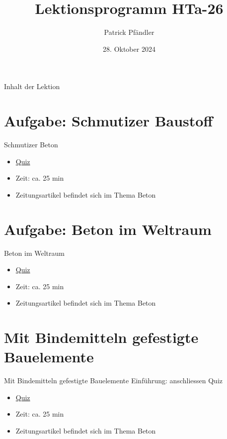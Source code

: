 

\title{\textbf{Lektionsprogramm HTa-26}}
\author{Patrick Pfändler}
\date{28. Oktober 2024}




\frame{\titlepage}

\begin{frame}{Inhalt der Lektion}
    \tableofcontents
\end{frame}


\section{Aufgabe: Schmutizer Baustoff}

\begin{frame}{Schmutizer Beton}
\begin{itemize}
	\item \href{https://www.classtime.com/code/8UH5E9}{Quiz}
	\item Zeit: ca. 25 min
	\item Zeitungsartikel befindet sich im Thema Beton
\end{itemize}
\end{frame}

%
\section{Aufgabe:  Beton im Weltraum}
\begin{frame}{Beton im Weltraum}
\begin{itemize}
	\item \href{https://www.classtime.com/code/286Y96}{Quiz}
	\item Zeit: ca. 25 min
	\item Zeitungsartikel befindet sich im Thema Beton
\end{itemize}
\end{frame}

\section{Mit Bindemitteln gefestigte Bauelemente }
\begin{frame}{Mit Bindemitteln gefestigte Bauelemente }
Einführung: anschliessen Quiz
\begin{itemize}
	\item \href{https://www.classtime.com/code/AH2ZVJ}{Quiz}
	\item Zeit: ca. 25 min
	\item Zeitungsartikel befindet sich im Thema Beton
\end{itemize}
\end{frame}

